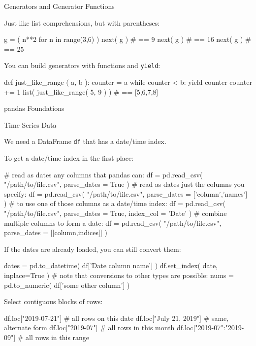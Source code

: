 \documentclass[a4paper,landscape,columns=3]{cheatsheet}
\def\chap#1{\vspace{5mm}\begin{tcolorbox}[colback=red!5!white,colframe=red!75!black,leftrule=3mm]
    \Large #1
\end{tcolorbox}}
\def\sect#1{\begin{tcolorbox}[colback=blue!5!white,colframe=blue!75!black,size=title,leftrule=2mm]
    \large #1
\end{tcolorbox}}
\begin{document}
\sect{Generators and Generator Functions}

Just like list comprehensions, but with parentheses:
\begin{python}
g = ( n**2 for n in range(3,6) )
next( g )                         # == 9
next( g )                         # == 16
next( g )                         # == 25
\end{python}

You can build generators with functions and \lstinline{yield}:
\begin{python}
def just_like_range ( a, b ):
    counter = a
    while counter < b:
        yield counter
        counter += 1
list( just_like_range( 5, 9 ) )   # == [5,6,7,8]
\end{python}

\chap{pandas Foundations}

\sect{Time Series Data}

We need a DataFrame \lstinline{df} that has a date/time index.

To get a date/time index in the first place:
\begin{python}
# read as dates any columns that pandas can:
df = pd.read_csv( "/path/to/file.csv",
                  parse_dates = True )
# read as dates just the columns you specify:
df = pd.read_csv( "/path/to/file.csv",
                  parse_dates = ['column','names'] )
# to use one of those columns as a date/time index:
df = pd.read_csv( "/path/to/file.csv",
                  parse_dates = True,
                  index_col = 'Date' )
# combine multiple columns to form a date:
df = pd.read_csv( "/path/to/file.csv",
                  parse_dates = [[column,indices]] )
\end{python}

If the dates are already loaded, you can still convert them:
\begin{python}
dates = pd.to_datetime( df['Date column name'] )
df.set_index( date, inplace=True )
# note that conversions to other types are possible:
nums = pd.to_numeric( df['some other column'] )
\end{python}

Select contiguous blocks of rows:
\begin{python}
df.loc["2019-07-21"]         # all rows on this date
df.loc["July 21, 2019"]      # same, alternate form
df.loc["2019-07"]            # all rows in this month
df.loc["2019-07":"2019-09"]  # all rows in this range
\end{python}
\end{document}
